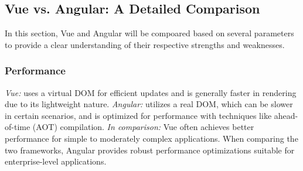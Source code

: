\documentclass[conference]{IEEEtran}
\begin{document}





\subsection{Vue vs. Angular: A Detailed Comparison}

In this section, Vue and Angular will be compoared based on several parameters to provide a clear understanding of their respective strengths and weaknesses.

\subsubsection{Performance}

\textit{Vue:} uses a virtual DOM for efficient updates and is generally faster in rendering due to its lightweight nature.
\newline\textit{Angular:} utilizes a real DOM, which can be slower in certain scenarios, and is optimized for performance with techniques like ahead-of-time (AOT) compilation.
\newline\textit{In comparison:} Vue often achieves better performance for simple to moderately complex applications. When comparing the two frameworks, Angular provides robust performance optimizations suitable for enterprise-level applications.
\end{document}
